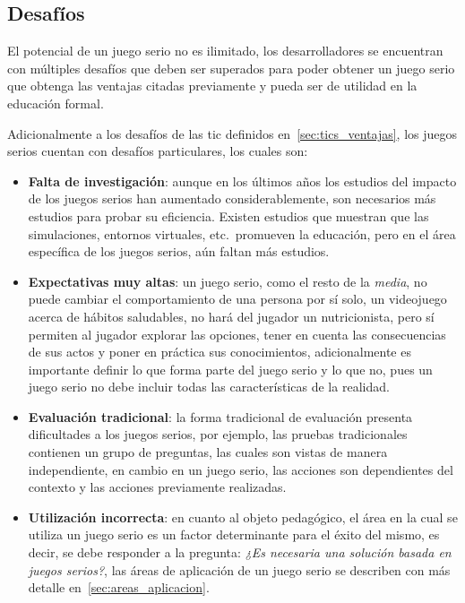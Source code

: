 \subsection{Desafíos}

El potencial de un juego serio no es ilimitado, los desarrolladores se
encuentran con múltiples desafíos que deben ser superados para poder obtener un
juego serio que obtenga las ventajas citadas previamente y pueda ser de utilidad
en la educación formal.

Adicionalmente a los desafíos de las \Gls{tic} definidos
en~\ref{sec:tics_ventajas}, los juegos serios cuentan con desafíos particulares,
los cuales son:

\begin{itemize}

\item \textbf{Falta de investigación}: aunque en los últimos años los estudios
    del impacto de los juegos serios han aumentado considerablemente, son
    necesarios más estudios para probar su eficiencia\cite{sg:aoverview}.
    Existen estudios que muestran que las simulaciones, entornos virtuales,
    etc.\ promueven la educación, pero en el área específica de los juegos
    serios, aún faltan más estudios\cite{sg:aoverview}.

\item \textbf{Expectativas muy altas}: un juego serio, como el resto de la
    \textit{media}, no puede cambiar el comportamiento de una persona por sí
    solo, un videojuego acerca de hábitos saludables, no hará del jugador un
    nutricionista, pero sí permiten al jugador explorar las opciones, tener en
    cuenta las consecuencias de sus actos y poner en práctica sus
    conocimientos\cite{education:games}, adicionalmente es importante definir lo
    que forma parte del juego serio y lo que no, pues un juego serio no debe
    incluir todas las características de la
    realidad\cite{stapleton2004serious,videojuegos:gonzaleztardon}. 

\item \textbf{Evaluación tradicional}: la forma tradicional de evaluación presenta
    dificultades a los juegos serios, por ejemplo, las pruebas tradicionales
    contienen un grupo de preguntas, las cuales son vistas de manera
    independiente, en cambio en un juego serio, las acciones son dependientes
    del contexto y las acciones previamente realizadas\cite{shute2009melding}.

\item \textbf{Utilización incorrecta}: en cuanto al objeto pedagógico, el área en
    la cual se utiliza un juego serio es un factor determinante para el éxito
    del mismo, es decir, se debe responder a la pregunta: \emph{¿Es necesaria
        una solución basada en juegos serios?}\cite{stapleton2004serious}, las
    áreas de aplicación de un juego serio se describen con más detalle
    en~\ref{sec:areas_aplicacion}.


\end{itemize}

